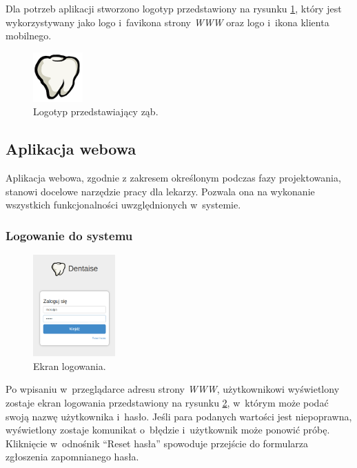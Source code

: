 \documentclass[11pt]{aghdpl}
\begin{document}
Dla potrzeb aplikacji stworzono logotyp przedstawiony na rysunku \ref{fig:logo}, który jest wykorzystywany jako logo i~favikona strony \emph{WWW} oraz logo i~ikona klienta mobilnego.

\begin{figure}[h!]
	\centering
	\includegraphics{logo}
	\caption{Logotyp przedstawiający ząb.}
	\label{fig:logo}
\end{figure}

\subsection{Aplikacja webowa}

Aplikacja webowa, zgodnie z zakresem określonym podczas fazy projektowania, stanowi docelowe narzędzie pracy dla lekarzy. Pozwala ona na wykonanie wszystkich funkcjonalności uwzględnionych w~systemie.

\subsubsection{Logowanie do systemu}

\begin{figure}
	\begin{center}
		\includegraphics[width=0.28\textwidth]{logowanie}
	\end{center}
	\caption{Ekran logowania.}
	\label{fig:logowanie}
\end{figure}

Po wpisaniu w~przeglądarce adresu strony \emph{WWW}, użytkownikowi wyświetlony zostaje ekran logowania przedstawiony na rysunku \ref{fig:logowanie}, w~którym może podać swoją nazwę użytkownika i~hasło. Jeśli para podanych wartości jest niepoprawna, wyświetlony zostaje komunikat o~błędzie i~użytkownik może ponowić próbę. Kliknięcie w~odnośnik ``Reset hasła'' spowoduje przejście do formularza zgłoszenia zapomnianego hasła.
\end{document}
